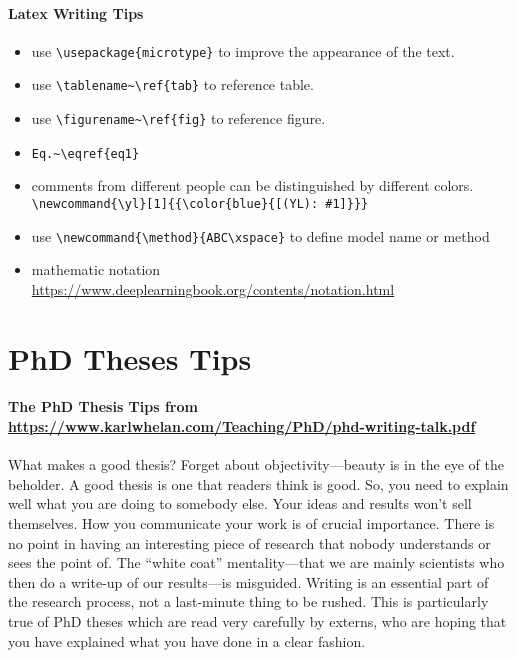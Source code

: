 \paragraph{Latex Writing Tips}

\begin{itemize}
	\item use \verb|\usepackage{microtype}| to improve the appearance of the text.
	\item use \verb|\tablename~\ref{tab}| to reference table.
	\item use \verb|\figurename~\ref{fig}| to reference figure.
	\item \verb|Eq.~\eqref{eq1}|
	\item comments from different people can be distinguished by different colors. \verb|\newcommand{\yl}[1]{{\color{blue}{[(YL): #1]}}}|
	\item use \verb|\newcommand{\method}{ABC\xspace}| to define model name or method
	\item mathematic notation \url{https://www.deeplearningbook.org/contents/notation.html}
\end{itemize}


\section{PhD Theses Tips}

\paragraph{The PhD Thesis Tips from \url{https://www.karlwhelan.com/Teaching/PhD/phd-writing-talk.pdf}}
What makes a good thesis? Forget about objectivity—beauty is in the eye of the beholder.
A good thesis is one that readers think is good.
So, you need to explain well what you are doing to somebody else.
Your ideas and results won’t sell themselves.
How you communicate your work is of crucial importance.
There is no point in having an interesting piece of research that nobody understands or sees the point of.
The “white coat” mentality—that we are mainly scientists who then do a write-up of our results—is misguided.
Writing is an essential part of the research process, not a last-minute thing to be rushed.
This is particularly true of PhD theses which are read very carefully by externs, who are hoping that you have explained what you have done in a clear fashion.

